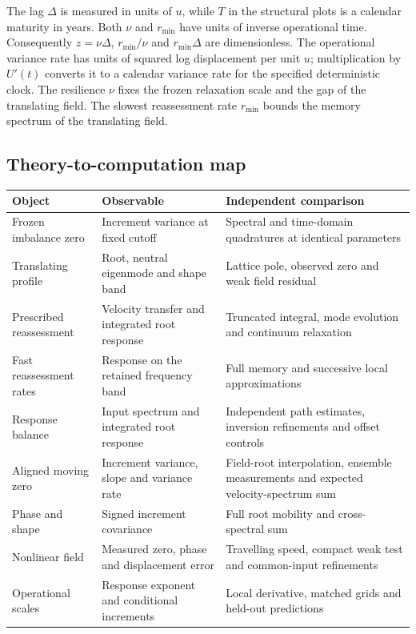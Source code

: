 \documentclass[11pt]{article}
\begin{document}
The lag \(\Delta\) is measured in units of \(u\), while \(T\) in the
structural plots is a calendar maturity in years. Both \(\nu\) and
\(r_{\min}\) have units of inverse operational time. Consequently
\(z=\nu\Delta\), \(r_{\min}/\nu\) and \(r_{\min}\Delta\) are
dimensionless. The operational variance rate has units of squared log
displacement per unit \(u\); multiplication by \(U'(t)\) converts it to
a calendar variance rate for the specified deterministic clock.
The resilience \(\nu\) fixes the frozen relaxation scale and the gap of
the translating field. The slowest reassessment rate \(r_{\min}\)
bounds the memory spectrum of the translating field.

\subsection{Theory-to-computation map}
\begin{center}
\small
\begin{tabular}{p{.23\linewidth}p{.31\linewidth}p{.36\linewidth}}
\toprule
Object & Observable & Independent comparison \\
\midrule
Frozen imbalance zero & Increment variance at fixed cutoff & Spectral and time-domain quadratures at identical parameters \\
Translating profile & Root, neutral eigenmode and shape band & Lattice pole, observed zero and weak field residual \\
Prescribed reassessment & Velocity transfer and integrated root response & Truncated integral, mode evolution and continuum relaxation \\
Fast reassessment rates & Response on the retained frequency band & Full memory and successive local approximations \\
Response balance & Input spectrum and integrated root response & Independent path estimates, inversion refinements and offset controls \\
Aligned moving zero & Increment variance, slope and variance rate & Field-root interpolation, ensemble measurements and expected velocity-spectrum sum \\
Phase and shape & Signed increment covariance & Full root mobility and cross-spectral sum \\
Nonlinear field & Measured zero, phase and displacement error & Travelling speed, compact weak test and common-input refinements \\
Operational scales & Response exponent and conditional increments & Local derivative, matched grids and held-out predictions \\
\bottomrule
\end{tabular}
\end{center}
\end{document}

